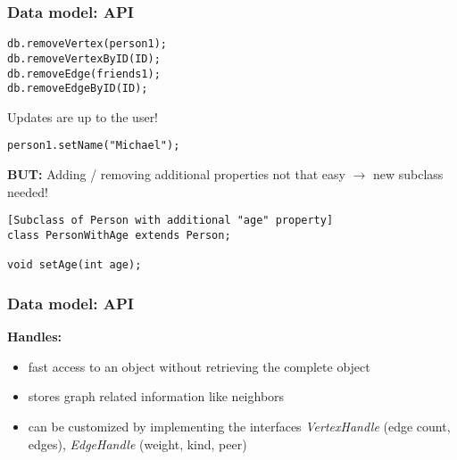 \begin{frame}[fragile]
\frametitle{Data model: API}

\begin{lstlisting}[caption=(Vertex / Edge removal)]
db.removeVertex(person1);
db.removeVertexByID(ID);
db.removeEdge(friends1);
db.removeEdgeByID(ID);
\end{lstlisting}

Updates are up to the user!
\begin{lstlisting}[User defined update method]
person1.setName("Michael");
\end{lstlisting}
\textbf{BUT:} Adding / removing additional properties not that easy $\rightarrow$ new subclass needed!
\begin{lstlisting}[Subclass of Person with additional "age" property]
class PersonWithAge extends Person;

void setAge(int age);
\end{lstlisting}
\end{frame}

\begin{frame}
\frametitle{Data model: API}

\textbf{Handles:} 
\begin{itemize}
	\item fast access to an object without retrieving the complete object
	\item stores graph related information like neighbors
	\item can be customized  by implementing the interfaces \textit{VertexHandle}
	(edge count, edges), \textit{EdgeHandle} (weight, kind, peer)
	
\end{itemize}
	
\end{frame}
